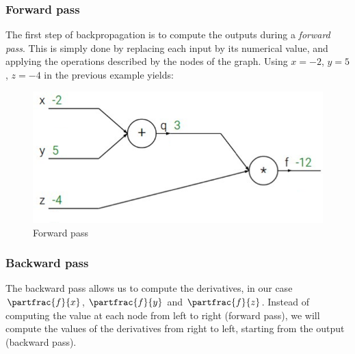 \subsubsection{Forward pass}
The first step of backpropagation is to compute the outputs during a \emph{forward pass}. This is simply done by replacing each input by its numerical value, and applying the operations described by the nodes of the graph. Using $x=-2$, $y=5$, $z=-4$ in the previous example yields:
\begin{figure}[H]
    \centering
    \includegraphics[width=.5\textwidth]{images/forward-graph.png}
    \caption{Forward pass}
\end{figure}

\subsubsection{Backward pass}
The backward pass allows us to compute the derivatives, in our case $\partfrac{f}{x}$, $\partfrac{f}{y}$ and $\partfrac{f}{z}$. Instead of computing the value at each node from left to right (forward pass), we will compute the values of the derivatives from right to left, starting from the output (backward pass).

